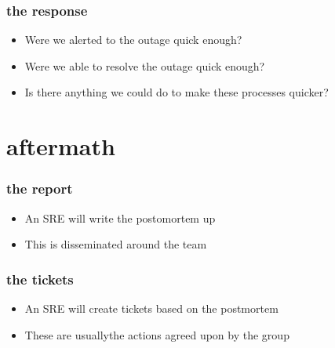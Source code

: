 \documentclass[]{beamer}
\begin{document}
\begin{frame}
  \frametitle{the response}

  \begin{itemize}[<+->]
  \item Were we alerted to the outage quick enough?
  \item Were we able to resolve the outage quick enough?
  \item Is there anything we could do to make these processes quicker?
  \end{itemize}
\end{frame}

\section{aftermath}
\begin{frame}
  \frametitle{the report}

  \begin{itemize}[<+->]
  \item An SRE will write the postomortem up
  \item This is disseminated around the team
  \end{itemize}
\end{frame}

\begin{frame}
  \frametitle{the tickets}

  \begin{itemize}[<+->]
  \item An SRE will create tickets based on the postmortem
  \item These are usuallythe actions agreed upon by the group
  \end{itemize}
\end{frame}
\end{document}
